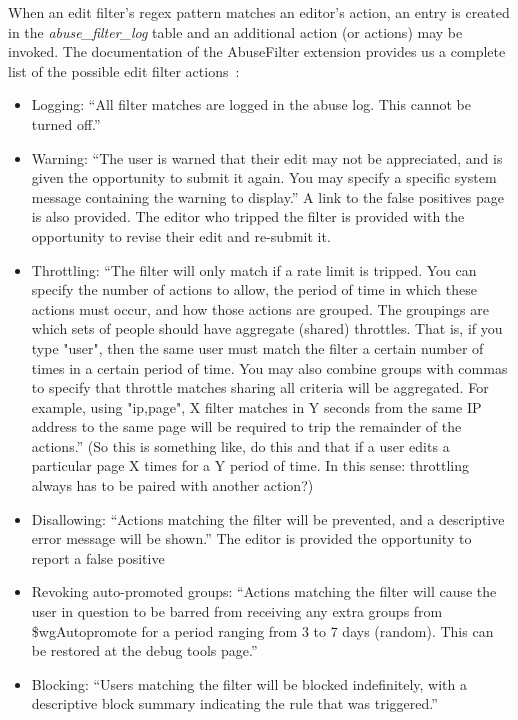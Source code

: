 When an edit filter's regex pattern matches an editor's action, an entry is created in the \emph{abuse\_filter\_log} table and an additional action (or actions) may be invoked.
The documentation of the AbuseFilter extension provides us a complete list of the possible edit filter actions~\cite{Mediawiki:AbuseFilterActions}:
\begin{itemize}
    \item Logging: ``All filter matches are logged in the abuse log. This cannot be turned off.''
    \item Warning: ``The user is warned that their edit may not be appreciated, and is given the opportunity to submit it again. You may specify a specific system message containing the warning to display.'' A link to the false positives page~\cite{Wikipedia:EditFilterFalsePositives} is also provided. The editor who tripped the filter is provided with the opportunity to revise their edit and re-submit it.
    \item Throttling: ``The filter will only match if a rate limit is tripped. You can specify the number of actions to allow, the period of time in which these actions must occur, and how those actions are grouped.
         The groupings are which sets of people should have aggregate (shared) throttles. That is, if you type "user", then the same user must match the filter a certain number of times in a certain period of time. You may also combine groups with commas to specify that throttle matches sharing all criteria will be aggregated. For example, using "ip,page", X filter matches in Y seconds from the same IP address to the same page will be required to trip the remainder of the actions.''
         (So this is something like, do this and that if a user edits a particular page X times for a Y period of time. In this sense: throttling always has to be paired with another action?)
    \item Disallowing: ``Actions matching the filter will be prevented, and a descriptive error message will be shown.'' The editor is provided the opportunity to report a false positive
    \item Revoking auto-promoted groups: ``Actions matching the filter will cause the user in question to be barred from receiving any extra groups from \$wgAutopromote for a period ranging from 3 to 7 days (random). This can be restored at the debug tools page.''
    \item Blocking: ``Users matching the filter will be blocked indefinitely, with a descriptive block summary indicating the rule that was triggered.''

\end{itemize}
